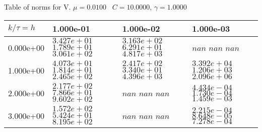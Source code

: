 \begin{center}
Table of norms for V. $\mu = 0.0100$ \, $C = 10.0000$, $\gamma = 1.0000$
  
\begin{tabular}{|p{1in}|p{1in}|p{1in}|p{1in}|} \hline
$k / \tau = h$ &1.000e-01 &1.000e-02 &1.000e-03 \\ \hline 
0.000e+00 & $3.427e+01$  $1.789e+01$  $3.061e+02$  & $3.163e+02$  $6.291e+01$  $4.817e+03$  & $nan$  $nan$  $nan$  \\ \hline 
1.000e+00 & $4.073e+01$  $1.814e+01$  $2.465e+02$  & $2.417e+02$  $3.340e+01$  $4.396e+03$  & $3.392e+04$  $1.206e+03$  $2.096e+06$  \\ \hline 
2.000e+00 & $2.177e+02$  $7.866e+01$  $9.602e+02$  & $nan$  $nan$  $nan$  & $4.434e-04$  $1.730e-04$  $1.459e-03$  \\ \hline 
3.000e+00 & $1.572e+02$  $5.424e+01$  $8.195e+02$  & $nan$  $nan$  $nan$  & $2.215e-04$  $8.648e-05$  $7.278e-04$  \\ \hline 

\end{tabular}\\[20pt]
\end{center}
